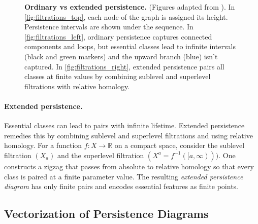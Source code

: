 \begin{figure}[t]
  \caption{\textbf{Ordinary vs extended persistence.} (Figures adapted from \cite{perslay}). In \ref{fig:filtrations_top}, each node of the graph is assigned its height. Persistence intervals are shown under the sequence. In \ref{fig:filtrations_left}, ordinary persistence captures connected components and loops, but essential classes lead to infinite intervals (black and green markers) and the upward branch (blue) isn't captured. In \ref{fig:filtrations_right}, extended persistence pairs all classes at finite values by combining sublevel and superlevel filtrations with relative homology.}
  \label{fig:filtrations}
\end{figure}


\paragraph{Extended persistence.}
Essential classes can lead to pairs with infinite lifetime. Extended persistence remedies this by combining sublevel and superlevel filtrations and using relative homology. For a function $f:X\to\mathbb{R}$ on a compact space, consider the sublevel filtration $(X_a)$ and the superlevel filtration $(X^a = f^{-1}([a,\infty)))$. One constructs a zigzag that passes from absolute to relative homology so that every class is paired at a finite parameter value. The resulting \emph{extended persistence diagram} has only finite pairs and encodes essential features as finite points.


\subsection{Vectorization of Persistence Diagrams}
\label{ssec:vectorization_persistence_diagrams}

